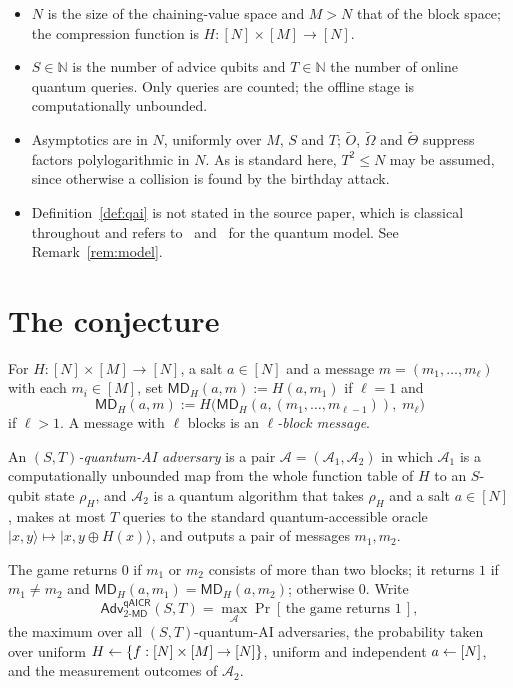 \documentclass{aicr-conjecture}
\newcommand{\MD}{\mathsf{MD}}
\newcommand{\Adv}{\mathsf{Adv}}
\newcommand{\qaicr}{\mathsf{qAICR}}
\newcommand{\tO}{\tilde{O}}
\newcommand{\tOm}{\tilde{\Omega}}
\newcommand{\tTh}{\tilde{\Theta}}
\begin{document}
\begin{itemize}
\item $N$ is the size of the chaining-value space and $M > N$ that of
  the block space; the compression function is
  $H : [N] \times [M] \to [N]$.
\item $S \in \mathbb{N}$ is the number of advice qubits and
  $T \in \mathbb{N}$ the number of online quantum queries. Only queries
  are counted; the offline stage is computationally unbounded.
\item Asymptotics are in $N$, uniformly over $M$, $S$ and $T$;
  $\tO$, $\tOm$ and $\tTh$ suppress factors polylogarithmic in $N$. As
  is standard here, $T^{2} \le N$ may be assumed, since otherwise a
  collision is found by the birthday attack.
\item Definition~\ref{def:qai} is not stated in the source paper, which
  is classical throughout and refers to~\cite{CGLQ20} and~\cite{GLLZ21}
  for the quantum model. See Remark~\ref{rem:model}.
\end{itemize}

\section{The conjecture}\label{sec:conjectures}

\begin{definition}\label{def:md}
For $H : [N] \times [M] \to [N]$, a salt $a \in [N]$ and a message
$m = (m_{1}, \dots, m_{\ell})$ with each $m_{i} \in [M]$, set
$\MD_{H}(a, m) := H(a, m_{1})$ if $\ell = 1$ and
\[
  \MD_{H}(a, m)
  := H\bigl(\MD_{H}(a, (m_{1}, \dots, m_{\ell-1})),\; m_{\ell}\bigr)
\]
if $\ell > 1$. A message with $\ell$ blocks is an
\emph{$\ell$-block message}.
\end{definition}

\begin{definition}\label{def:qai}
An \emph{$(S,T)$-quantum-AI adversary} is a pair
$\mathcal{A} = (\mathcal{A}_{1}, \mathcal{A}_{2})$ in which
$\mathcal{A}_{1}$ is a computationally unbounded map from the whole
function table of $H$ to an $S$-qubit state $\rho_{H}$, and
$\mathcal{A}_{2}$ is a quantum algorithm that takes $\rho_{H}$ and a
salt $a \in [N]$, makes at most $T$ queries to the standard
quantum-accessible oracle
$\lvert x, y \rangle \mapsto \lvert x, y \oplus H(x) \rangle$, and
outputs a pair of messages $m_{1}, m_{2}$.

The game returns $0$ if $m_{1}$ or $m_{2}$ consists of more than two
blocks; it returns $1$ if $m_{1} \ne m_{2}$ and
$\MD_{H}(a, m_{1}) = \MD_{H}(a, m_{2})$; otherwise $0$. Write
\[
  \Adv^{\qaicr}_{2\text{-}\MD}(S,T)
  = \max_{\mathcal{A}} \Pr[\,\text{the game returns } 1\,],
\]
the maximum over all $(S,T)$-quantum-AI adversaries, the probability
taken over uniform $H \leftarrow \{f : [N] \times [M] \to [N]\}$, uniform
and independent $a \leftarrow [N]$, and the measurement outcomes of
$\mathcal{A}_{2}$.
\end{definition}
\end{document}

